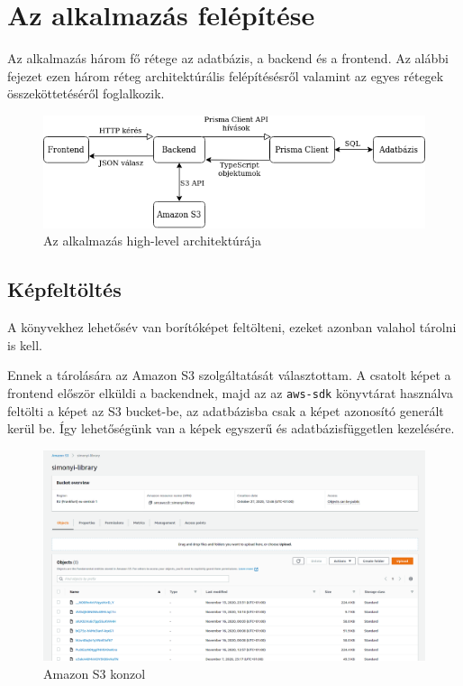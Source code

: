 \chapter{Az alkalmazás felépítése}

Az alkalmazás három fő rétege az adatbázis, a backend és a frontend. Az alábbi fejezet ezen három réteg architektúrális
felépítésésről valamint az egyes rétegek összeköttetéséről foglalkozik.

\begin{figure}[!ht]
  \centering
  \includegraphics[width=150mm, keepaspectratio]{figures/architecture-diagram.png}
  \caption{Az alkalmazás high-level architektúrája}
  \label{fig:Architecture}
\end{figure}









\section{Képfeltöltés}

A könyvekhez lehetősév van borítóképet feltölteni, ezeket azonban valahol tárolni is kell.

Ennek a tárolására az Amazon S3 szolgáltatását választottam. A csatolt képet a frontend először elküldi a backendnek,
majd az az \lstinline|aws-sdk| könyvtárat használva feltölti a képet az S3 bucket-be, az adatbázisba csak a képet
azonosító generált kerül be. Így lehetőségünk van a képek egyszerű és adatbázisfüggetlen kezelésére.

\begin{figure}[!ht]
  \centering
  \includegraphics[width=125mm, keepaspectratio]{figures/s3-dashboard.png}
  \caption{Amazon S3 konzol}
  \label{fig:S3Console}
\end{figure}
